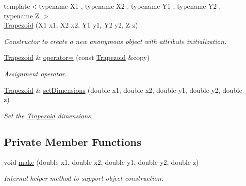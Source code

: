 \begin{DoxyCompactItemize}
{\footnotesize template$<$typename X1 , typename X2 , typename Y1 , typename Y2 , typename Z $>$ }\\\hyperlink{class_d_d4hep_1_1_geometry_1_1_trapezoid_a18a00d7d7e949210f07839329c04386c}{Trapezoid} (X1 x1, X2 x2, Y1 y1, Y2 y2, Z z)
\begin{DoxyCompactList}\small\item\em Constructor to create a new anonymous object with attribute initialization. \item\end{DoxyCompactList}\item 
\hyperlink{class_d_d4hep_1_1_geometry_1_1_trapezoid}{Trapezoid} \& \hyperlink{class_d_d4hep_1_1_geometry_1_1_trapezoid_a9d413378312d775bce87cbacefed99e6}{operator=} (const \hyperlink{class_d_d4hep_1_1_geometry_1_1_trapezoid}{Trapezoid} \&copy)
\begin{DoxyCompactList}\small\item\em Assignment operator. \item\end{DoxyCompactList}\item 
\hyperlink{class_d_d4hep_1_1_geometry_1_1_trapezoid}{Trapezoid} \& \hyperlink{class_d_d4hep_1_1_geometry_1_1_trapezoid_ad36a96cf7a7fbcd3145ca664e2c8fa39}{setDimensions} (double x1, double x2, double y1, double y2, double z)
\begin{DoxyCompactList}\small\item\em Set the \hyperlink{class_d_d4hep_1_1_geometry_1_1_trapezoid}{Trapezoid} dimensions. \item\end{DoxyCompactList}\end{DoxyCompactItemize}
\subsection*{Private Member Functions}
\begin{DoxyCompactItemize}
\item 
void \hyperlink{class_d_d4hep_1_1_geometry_1_1_trapezoid_ae6901e6e8639b330b5ecacff7c91792c}{make} (double x1, double x2, double y1, double y2, double z)
\begin{DoxyCompactList}\small\item\em Internal helper method to support object construction. \item\end{DoxyCompactList}\end{DoxyCompactItemize}


